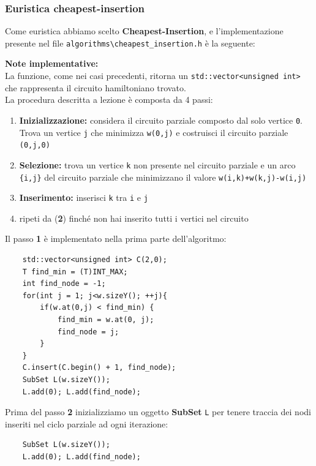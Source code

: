 \documentclass[]{article}
\begin{document}
\subsubsection{Euristica cheapest-insertion}
\begin{flushleft}
Come euristica abbiamo scelto \textbf{Cheapest-Insertion}, e l'implementazione presente nel file \verb|algorithms\cheapest_insertion.h| è la seguente:
\lstset{language=c++, style=mystyle}


\textbf{Note implementative:}\\
La funzione, come nei casi precedenti, ritorna un \verb|std::vector<unsigned int>| che rappresenta il circuito hamiltoniano trovato.\\
La procedura descritta a lezione è composta da 4 passi:
\begin{enumerate}
\item \textbf{Inizializzazione:} considera il circuito parziale composto dal solo vertice \verb|0|. Trova un vertice \verb|j| che minimizza \verb|w(0,j)| e costruisci il circuito parziale \verb|(0,j,0)|
\item \textbf{Selezione:} trova un vertice \verb|k| non presente nel circuito parziale e un arco \verb|{i,j}| del circuito parziale che minimizzano il valore \verb|w(i,k)+w(k,j)-w(i,j)|
\item \textbf{Inserimento:} inserisci \verb|k| tra \verb|i| e \verb|j|
\item ripeti da (\textbf{2}) finché non hai inserito tutti i vertici nel circuito
\end{enumerate}
Il passo \textbf{1} è implementato nella prima parte dell'algoritmo:
\lstset{language=c++, style=mystyle, firstnumber=2}
\begin{lstlisting}
    std::vector<unsigned int> C(2,0);
    T find_min = (T)INT_MAX;
    int find_node = -1;
    for(int j = 1; j<w.sizeY(); ++j){
        if(w.at(0,j) < find_min) {
            find_min = w.at(0, j);
            find_node = j;
        }
    }
    C.insert(C.begin() + 1, find_node);
    SubSet L(w.sizeY());
    L.add(0); L.add(find_node);
\end{lstlisting}
Prima del passo \textbf{2} inizializziamo un oggetto \textbf{SubSet} \verb|L| per tenere traccia dei nodi inseriti nel ciclo parziale ad ogni iterazione:
\lstset{language=c++, style=mystyle, firstnumber=12}
\begin{lstlisting}
    SubSet L(w.sizeY());
    L.add(0); L.add(find_node);
\end{lstlisting}

\end{flushleft}
\end{document}
